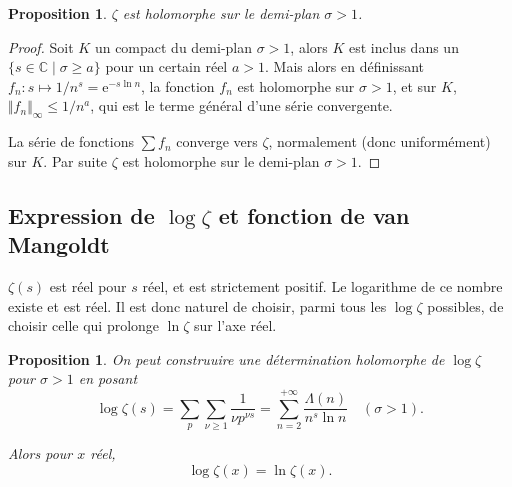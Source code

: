 \documentclass[french]{report}
\newtheorem{proposition}[theorem]{Proposition}
\begin{document}
\begin{proposition}
  $\zeta$ est holomorphe sur le demi-plan $\sigma > 1$.
\end{proposition}

\begin{proof}
  Soit $K$ un compact du demi-plan $\sigma > 1$, alors $K$ est inclus dans un $\{ s\in\mathbb{C} \mid \sigma \geq a \}$ pour un certain réel $a > 1$. Mais alors en définissant $f_n: s \mapsto 1 / n^s = \mathrm{e}^{-s\ln n}$, la fonction $f_n$ est holomorphe sur $\sigma > 1$, et sur $K$, $\Vert{f_n}\Vert_\infty \leq 1 / n^a$, qui est le terme général d'une série convergente.
  
  La série de fonctions $\sum f_n$ converge vers $\zeta$, normalement (donc uniformément) sur $K$. Par suite $\zeta$ est holomorphe sur le demi-plan $\sigma > 1$.
\end{proof}

\subsection{Expression de $\log\zeta$ et fonction de van Mangoldt}

$\zeta(s)$ est réel pour $s$ réel, et est strictement positif. Le logarithme de ce nombre existe et est réel. Il est donc naturel de choisir, parmi tous les $\log\zeta$ possibles, de choisir celle qui prolonge $\ln\zeta$ sur l'axe réel.

\begin{proposition}\label{prop:log-zeta}
  On peut construuire une détermination holomorphe de $\log\zeta$ pour $\sigma>1$ en posant
  \[
    \log\zeta(s)
    = \sum_p\sum_{\nu\geq1}\frac{1}{\nu p^{\nu s}}
    = \sum_{n=2}^{+\infty}\frac{\Lambda(n)}{n^s\ln n}\quad(\sigma>1).
  \]

  Alors pour $x$ réel,
  \[ \log\zeta(x) = \ln\zeta(x). \]
\end{proposition}
\end{document}

